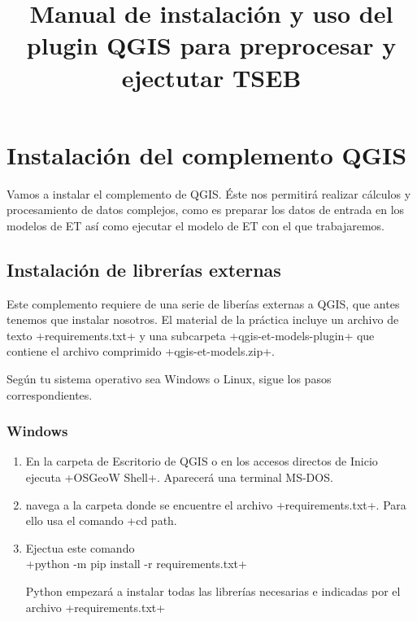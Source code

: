 \documentclass[a4paper,11pt]{article}
\title{Manual de instalación y uso del plugin QGIS para preprocesar y ejectutar TSEB}
\date{\vspace{-5ex}}
\author{\vspace{-5ex}}
\begin{document}
\maketitle

\section{Instalación del complemento QGIS}\label{sec:configuracion}
Vamos a instalar el complemento de QGIS. Éste nos permitirá realizar cálculos y procesamiento de datos complejos, como es preparar los datos de entrada en los modelos de ET así como ejecutar el modelo de ET con el que trabajaremos. 

\subsection{Instalación de librerías externas}
Este complemento requiere de una serie de liberías externas a QGIS, que antes tenemos que instalar nosotros. El material de la práctica incluye un archivo de texto \cverb+requirements.txt+ y una subcarpeta \cverb+qgis-et-models-plugin+ que contiene el archivo comprimido \cverb+qgis-et-models.zip+.

Según tu sistema operativo sea Windows o Linux, sigue los pasos correspondientes.

\subsubsection{Windows}
\begin{enumerate}
 \item En la carpeta de Escritorio de QGIS o en los accesos directos de Inicio ejecuta \cverb+OSGeoW Shell+. Aparecerá una terminal MS-DOS.
 
 \item navega a la carpeta donde se encuentre el archivo \cverb+requirements.txt+. Para ello usa el comando \cverb+cd path\a\la\carpeta\+.
 
 \item Ejectua este comando\\\cverb+python -m pip install -r requirements.txt+
 
 Python empezará a instalar todas las librerías necesarias e indicadas por el archivo \cverb+requirements.txt+
\end{enumerate}
\end{document}
